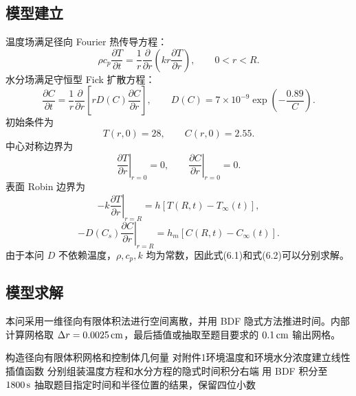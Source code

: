 \documentclass[UTF8,a4paper,12pt]{ctexart}
\numberwithin{equation}{section}
\begin{document}
\subsection{模型建立}
温度场满足径向 Fourier 热传导方程：
\begin{equation}
  \rho c_p\frac{\partial T}{\partial t}
  =\frac1r\frac{\partial}{\partial r}
  \left(kr\frac{\partial T}{\partial r}\right),
  \qquad 0<r<R.
\end{equation}
水分场满足守恒型 Fick 扩散方程：
\begin{equation}
  \frac{\partial C}{\partial t}
  =\frac1r\frac{\partial}{\partial r}
  \left[rD(C)\frac{\partial C}{\partial r}\right],
  \qquad
  D(C)=7\times10^{-9}\exp\left(-\frac{0.89}{C}\right).
\end{equation}
初始条件为
\begin{equation}
  T(r,0)=28,\qquad C(r,0)=2.55.
\end{equation}
中心对称边界为
\begin{equation}
  \left.\frac{\partial T}{\partial r}\right|_{r=0}=0,\qquad
  \left.\frac{\partial C}{\partial r}\right|_{r=0}=0.
\end{equation}
表面 Robin 边界为
\begin{equation}
  -k\left.\frac{\partial T}{\partial r}\right|_{r=R}
  =h\left[T(R,t)-T_\infty(t)\right],
\end{equation}
\begin{equation}
  -D(C_s)\left.\frac{\partial C}{\partial r}\right|_{r=R}
  =h_m\left[C(R,t)-C_\infty(t)\right].
\end{equation}
由于本问 $D$ 不依赖温度，$\rho,c_p,k$ 均为常数，因此式(6.1)和式(6.2)可以分别求解。

\subsection{模型求解}
本问采用一维径向有限体积法进行空间离散，并用 BDF 隐式方法推进时间。内部计算网格取 $\Delta r=0.0025\rm\,cm$，最后插值或抽取至题目要求的 $0.1\rm\,cm$ 输出网格。

\begin{algorithm}[H]
  \SetAlgoLined
  构造径向有限体积网格和控制体几何量\;
  对附件1环境温度和环境水分浓度建立线性插值函数\;
  分别组装温度方程和水分方程的隐式时间积分右端\;
  用 BDF 积分至 $1800\rm\,s$\;
  抽取题目指定时间和半径位置的结果，保留四位小数\;
  \caption{问题一求解流程}
\end{algorithm}
\end{document}
